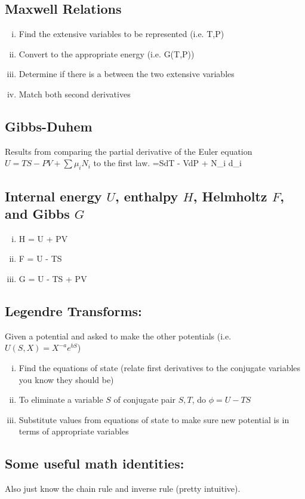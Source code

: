 \documentclass[12pt]{article}
\begin{document}
\subsection{Maxwell Relations}
\begin{enumerate}[(i)]
\item Find the extensive variables to be represented (i.e. T,P)
\item Convert to the appropriate energy (i.e. G(T,P))
\item Determine if there is a  between the two extensive variables
\item Match both second derivatives
\end{enumerate}
\subsection{Gibbs-Duhem}
Results from comparing the partial derivative of the Euler equation $U = TS - PV + \sum\mu_i N_i$ to the first law.
=SdT - VdP + \sum N_i d\mu_i
\eqe
\subsection{Internal energy $U$, enthalpy $H$, Helmholtz $F$, and Gibbs $G$}
\begin{enumerate}[(i)]
\item H = U + PV
\item F = U - TS
\item G = U - TS + PV
\end{enumerate}
\subsection{Legendre Transforms:}
Given a potential and asked to make the other potentials (i.e. $U(S,X) = X^{-a}e^{bS}$)
\begin{enumerate}[(i)]
\item Find the equations of state (relate first derivatives to the conjugate variables you know they should be)
\item To eliminate a variable $S$ of conjugate pair $S,T$, do $\phi= U-TS$
\item Substitute values from equations of state to make sure new potential is in terms of appropriate variables
\end{enumerate}
%
\subsection{Some useful math identities:}
\eqs{}
\eqe
\eqs {}
\eqe
Also just know the chain rule and inverse rule (pretty intuitive). \\ 
\end{document}
